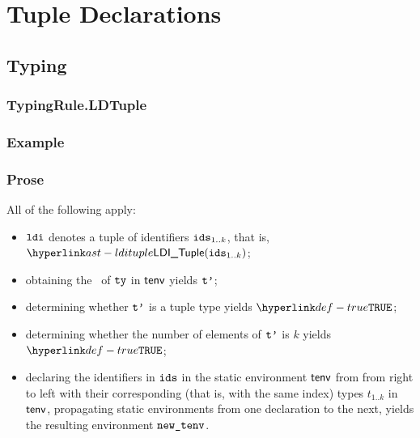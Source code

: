 \section{Tuple Declarations\label{sec:TupleDeclarations}}
\subsection{Typing}
\subsubsection{TypingRule.LDTuple\label{sec:TypingRule.LDTuple}}
\subsubsection{Example}

\subsubsection{Prose}
All of the following apply:
\begin{itemize}
  \item $\texttt{ldi}$ denotes a tuple of identifiers $\texttt{ids}_{1..k}$, that is, $\LDITuple(\vids_{1..k})$;
  \item obtaining the \underlyingtype\ of $\texttt{ty}$ in $\textsf{tenv}$ yields $\texttt{t'}$\ProseOrTypeError;
  \item determining whether $\texttt{t'}$ is a tuple type yields $\True$\ProseOrTypeError;
  \item determining whether the number of elements of $\texttt{t'}$ is $k$ yields $\True$\ProseOrTypeError;
  \item declaring the identifiers in $\texttt{ids}$ in the static environment $\textsf{tenv}$ from from right to left with their corresponding
        (that is, with the same index) types $t_{1..k}$ in $\textsf{tenv}$,
        propagating static environments from one declaration to the next,
        yields the resulting environment $\texttt{new\_tenv}$\ProseOrTypeError.
\end{itemize}
